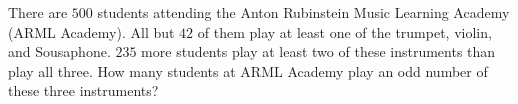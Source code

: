 There are $500$ students attending the Anton Rubinstein Music Learning Academy (ARML Academy). All but $42$ of them play at least one of the trumpet, violin, and Sousaphone. $235$ more students play at least two of these instruments than play all three. How many students at ARML Academy play an odd number of these three instruments?